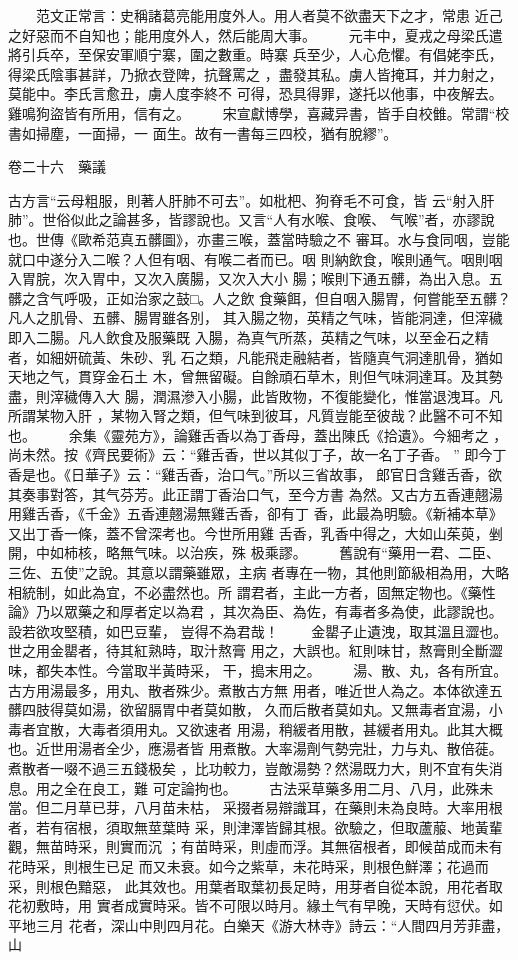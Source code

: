 \documentclass{ctexart}
\begin{document}
　　范文正常言：史稱諸葛亮能用度外人。用人者莫不欲盡天下之才，常患 近己之好惡而不自知也；能用度外人，然后能周大事。 　　元丰中，夏戎之母梁氏遣將引兵卒，至保安軍順宁寨，圍之數重。時寨 兵至少，人心危懼。有倡姥李氏，得梁氏陰事甚詳，乃掀衣登陴，抗聲罵之 ，盡發其私。虜人皆掩耳，并力射之，莫能中。李氏言愈丑，虜人度李終不 可得，恐具得罪，遂托以他事，中夜解去。雞鳴狗盜皆有所用，信有之。 　　宋宣獻博學，喜藏异書，皆手自校雔。常謂``校書如掃塵，一面掃，一 面生。故有一書每三四校，猶有脫繆''。

卷二十六　藥議

古方言``云母粗服，則著人肝肺不可去''。如枇杷、狗脊毛不可食，皆 云``射入肝肺''。世俗似此之論甚多，皆謬說也。又言``人有水喉、食喉、 气喉''者，亦謬說也。世傳《歐希范真五髒圖》，亦畫三喉，蓋當時驗之不 審耳。水与食同咽，豈能就口中遂分入二喉？人但有咽、有喉二者而已。咽 則納飲食，喉則通气。咽則咽入胃脘，次入胃中，又次入廣腸，又次入大小 腸；喉則下通五髒，為出入息。五髒之含气呼吸，正如治家之鼓□。人之飲 食藥餌，但自咽入腸胃，何嘗能至五髒？凡人之肌骨、五髒、腸胃雖各別， 其入腸之物，英精之气味，皆能洞達，但滓穢即入二腸。凡人飲食及服藥既 入腸，為真气所蒸，英精之气味，以至金石之精者，如細妍硫黃、朱砂、乳 石之類，凡能飛走融結者，皆隨真气洞達肌骨，猶如天地之气，貫穿金石土 木，曾無留礙。自餘頑石草木，則但气味洞達耳。及其勢盡，則滓穢傳入大 腸，潤濕滲入小腸，此皆敗物，不復能變化，惟當退洩耳。凡所謂某物入肝 ，某物入腎之類，但气味到彼耳，凡質豈能至彼哉？此醫不可不知也。 　　余集《靈苑方》，論雞舌香以為丁香母，蓋出陳氏《拾遺》。今細考之 ，尚未然。按《齊民要術》云：``雞舌香，世以其似丁子，故一名丁子香。 '' 即今丁香是也。《日華子》云：``雞舌香，治口气。''所以三省故事， 郎官日含雞舌香，欲其奏事對答，其气芬芳。此正謂丁香治口气，至今方書 為然。又古方五香連翹湯用雞舌香，《千金》五香連翹湯無雞舌香，卻有丁 香，此最為明驗。《新補本草》又出丁香一條，蓋不曾深考也。今世所用雞 舌香，乳香中得之，大如山茱萸，剉開，中如柿核，略無气味。以治疾，殊 极乘謬。 　　舊說有``藥用一君、二臣、三佐、五使''之說。其意以謂藥雖眾，主病 者專在一物，其他則節級相為用，大略相統制，如此為宜，不必盡然也。所 謂君者，主此一方者，固無定物也。《藥性論》乃以眾藥之和厚者定以為君 ，其次為臣、為佐，有毒者多為使，此謬說也。設若欲攻堅積，如巴豆輩， 豈得不為君哉！ 　　金罌子止遺洩，取其溫且澀也。世之用金罌者，待其紅熟時，取汁熬膏 用之，大誤也。紅則味甘，熬膏則全斷澀味，都失本性。今當取半黃時采， 干，搗末用之。 　　湯、散、丸，各有所宜。古方用湯最多，用丸、散者殊少。煮散古方無 用者，唯近世人為之。本体欲達五髒四肢得莫如湯，欲留膈胃中者莫如散， 久而后散者莫如丸。又無毒者宜湯，小毒者宜散，大毒者須用丸。又欲速者 用湯，稍緩者用散，甚緩者用丸。此其大概也。近世用湯者全少，應湯者皆 用煮散。大率湯劑气勢完壯，力与丸、散倍蓰。煮散者一啜不過三五錢极矣 ，比功較力，豈敵湯勢？然湯既力大，則不宜有失消息。用之全在良工，難 可定論拘也。 　　古法采草藥多用二月、八月，此殊未當。但二月草已芽，八月苗未枯， 采掇者易辯識耳，在藥則未為良時。大率用根者，若有宿根，須取無莖葉時 采，則津澤皆歸其根。欲驗之，但取蘆菔、地黃輩觀，無苗時采，則實而沉 ；有苗時采，則虛而浮。其無宿根者，即候苗成而未有花時采，則根生已足 而又未衰。如今之紫草，未花時采，則根色鮮澤；花過而采，則根色黯惡， 此其效也。用葉者取葉初長足時，用芽者自從本說，用花者取花初敷時，用 實者成實時采。皆不可限以時月。緣土气有早晚，天時有愆伏。如平地三月 花者，深山中則四月花。白樂天《游大林寺》詩云：``人間四月芳菲盡，山 
\end{document}
